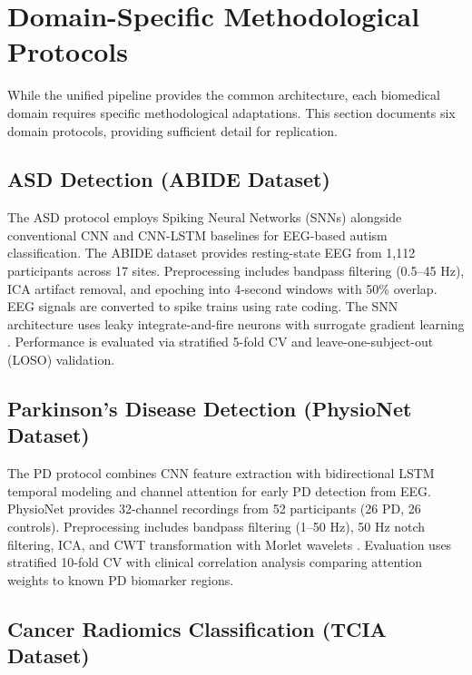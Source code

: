 \section{Domain-Specific Methodological Protocols}
\label{sec:domain_methods}

While the unified pipeline provides the common architecture, each biomedical domain requires specific methodological adaptations. This section documents six domain protocols, providing sufficient detail for replication.

\subsection{ASD Detection (ABIDE Dataset)}
\label{sec:asd_method}

The ASD protocol employs Spiking Neural Networks (SNNs) alongside conventional CNN and CNN-LSTM baselines for EEG-based autism classification. The ABIDE dataset \citep{dimartino2014abide} provides resting-state EEG from 1,112 participants across 17 sites. Preprocessing includes bandpass filtering (0.5--45 Hz), ICA artifact removal, and epoching into 4-second windows with 50\% overlap. EEG signals are converted to spike trains using rate coding. The SNN architecture uses leaky integrate-and-fire neurons with surrogate gradient learning \citep{lecun2015deep}. Performance is evaluated via stratified 5-fold CV and leave-one-subject-out (LOSO) validation.

\subsection{Parkinson's Disease Detection (PhysioNet Dataset)}
\label{sec:pd_method}

The PD protocol combines CNN feature extraction with bidirectional LSTM temporal modeling and channel attention for early PD detection from EEG. PhysioNet \citep{goldberger2000physionet} provides 32-channel recordings from 52 participants (26 PD, 26 controls). Preprocessing includes bandpass filtering (1--50 Hz), 50 Hz notch filtering, ICA, and CWT transformation with Morlet wavelets \citep{geraedts2018eeg, chaturvedi2017pd}. Evaluation uses stratified 10-fold CV with clinical correlation analysis comparing attention weights to known PD biomarker regions.

\subsection{Cancer Radiomics Classification (TCIA Dataset)}
\label{sec:cancer_method}

